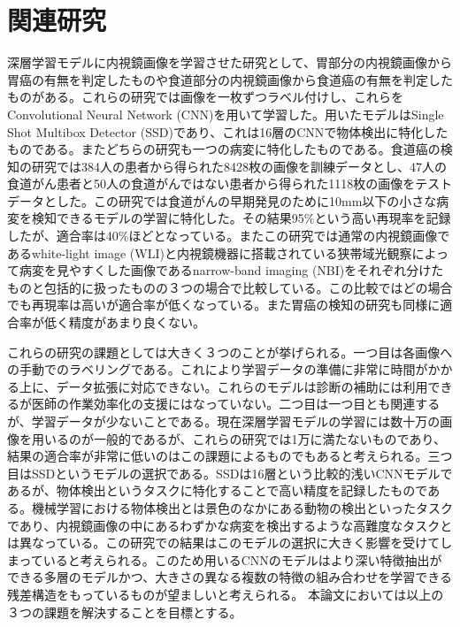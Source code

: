 \section{関連研究}
深層学習モデルに内視鏡画像を学習させた研究として、胃部分の内視鏡画像から胃癌の有無を判定したもの\cite{stomach_cancer}や食道部分の内視鏡画像から食道癌の有無を判定したもの\cite{stomach_cancer}がある。これらの研究では画像を一枚ずつラベル付けし、これらをConvolutional Neural Network (CNN)\cite{CNN}を用いて学習した。用いたモデルはSingle Shot Multibox Detector (SSD)\cite{SSD}であり、これは16層のCNNで物体検出に特化したものである。またどちらの研究も一つの病変に特化したものである。食道癌の検知の研究では384人の患者から得られた8428枚の画像を訓練データとし、47人の食道がん患者と50人の食道がんではない患者から得られた1118枚の画像をテストデータとした。この研究では食道がんの早期発見のために10mm以下の小さな病変を検知できるモデルの学習に特化した。その結果95\%という高い再現率を記録したが、適合率は40\%ほどとなっている。またこの研究では通常の内視鏡画像であるwhite-light image (WLI)と内視鏡機器に搭載されている狭帯域光観察によって病変を見やすくした画像であるnarrow-band imaging (NBI)をそれぞれ分けたものと包括的に扱ったものの３つの場合で比較している。この比較ではどの場合でも再現率は高いが適合率が低くなっている。また胃癌の検知の研究も同様に適合率が低く精度があまり良くない。

これらの研究の課題としては大きく３つのことが挙げられる。一つ目は各画像への手動でのラベリングである。これにより学習データの準備に非常に時間がかかる上に、データ拡張に対応できない。これらのモデルは診断の補助には利用できるが医師の作業効率化の支援にはなっていない。二つ目は一つ目とも関連するが、学習データが少ないことである。現在深層学習モデルの学習には数十万の画像を用いるのが一般的であるが、これらの研究では1万に満たないものであり、結果の適合率が非常に低いのはこの課題によるものでもあると考えられる。三つ目はSSDというモデルの選択である。SSDは16層という比較的浅いCNNモデルであるが、物体検出というタスクに特化することで高い精度を記録したものである。機械学習における物体検出とは景色のなかにある動物の検出といったタスクであり、内視鏡画像の中にあるわずかな病変を検出するような高難度なタスクとは異なっている。この研究での結果はこのモデルの選択に大きく影響を受けてしまっていると考えられる。このため用いるCNNのモデルはより深い特徴抽出ができる多層のモデルかつ、大きさの異なる複数の特徴の組み合わせを学習できる残差構造をもっているものが望ましいと考えられる。
本論文においては以上の３つの課題を解決することを目標とする。
